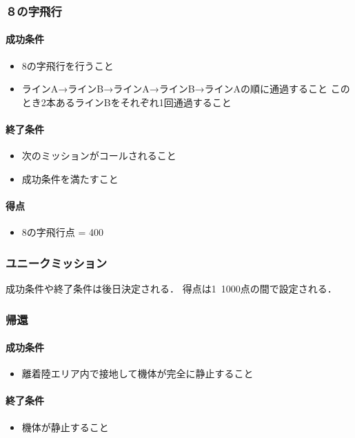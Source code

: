 \subsubsection{８の字飛行}
\paragraph{成功条件}
\begin{itemize}
\item 8の字飛行を行うこと
\item ラインA→ラインB→ラインA→ラインB→ラインAの順に通過すること\newline
このとき2本あるラインBをそれぞれ1回通過すること
\end{itemize}
\paragraph{終了条件}
\begin{itemize}
\item 次のミッションがコールされること
\item 成功条件を満たすこと
\end{itemize}
\paragraph{得点}
\begin{itemize}
\item 8の字飛行点 = 400
\end{itemize}

\subsubsection{ユニークミッション}
成功条件や終了条件は後日決定される．
得点は1~1000点の間で設定される．

\subsubsection{帰還}
\paragraph{成功条件}
\begin{itemize}
\item 離着陸エリア内で接地して機体が完全に静止すること
\end{itemize}
\paragraph{終了条件}
\begin{itemize}
\item 機体が静止すること
\end{itemize}
